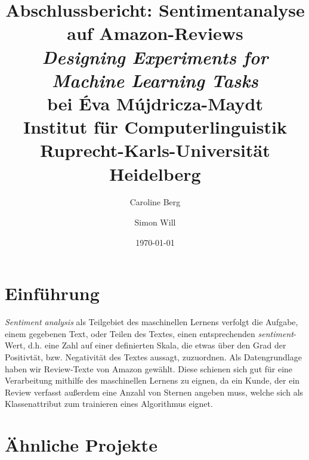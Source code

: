 \documentclass[a4paper]{article}
\title{Abschlussbericht: Sentimentanalyse auf Amazon-Reviews\\[0.5cm]
\large \textit{Designing Experiments for Machine Learning Tasks}\\[0.2cm]
\large bei Éva Mújdricza-Maydt\\[0.2cm]
\large Institut für Computerlinguistik\\[0.2cm]
\large Ruprecht-Karls-Universität Heidelberg\\}
\author{Caroline Berg \and Simon Will}
\date{\today}
\newcommand{\ourhighlight}[1]{\textit{#1}}
\begin{document}
\maketitle
\newpage


\tableofcontents
\newpage



\section{Einführung}

\ourhighlight{Sentiment analysis} als Teilgebiet des maschinellen Lernens verfolgt die Aufgabe, einem gegebenen Text, oder Teilen des Textes, einen entsprechenden \ourhighlight{sentiment}-Wert, d.h. eine Zahl auf einer definierten Skala, die etwas über den Grad der Positivtät, bzw. Negativität des Textes aussagt, zuzuordnen.\newline
Als Datengrundlage haben wir Review-Texte von Amazon gewählt. Diese schienen sich gut für eine Verarbeitung mithilfe des maschinellen Lernens zu eignen, da ein Kunde, der ein Review verfasst außerdem eine Anzahl von Sternen angeben muss, welche sich als Klassenattribut zum trainieren eines Algorithmus eignet. 


\section{Ähnliche Projekte}
\end{document}
